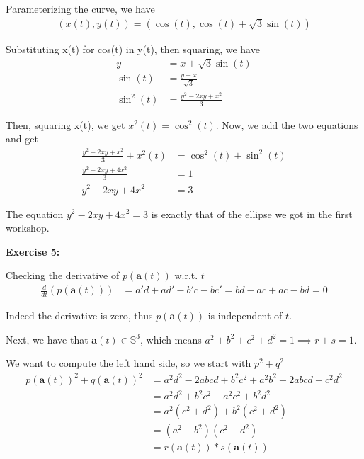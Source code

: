 \documentclass[12pt]{article}
\begin{document}
Parameterizing the curve, we have
\begin{align*}
    (x(t), y(t)) = (\cos(t), \cos(t) + \sqrt{3}\sin(t))
\end{align*}

Substituting x(t) for cos(t) in y(t), then squaring, we have
\begin{align*}
    y         & = x + \sqrt{3}\sin(t)      \\
    \sin(t)   & = \frac{y-x}{\sqrt{3}}     \\
    \sin^2(t) & =  \frac{y^2-2xy + x^2}{3}
\end{align*}

Then, squaring x(t), we get $x^2(t) = \cos^2(t)$. Now, we add the two equations and get
\begin{align*}
    \frac{y^2-2xy + x^2}{3} + x^2(t) & = \cos^2(t) + \sin^2(t) \\
    \frac{y^2-2xy + 4x^2}{3}         & = 1                     \\
    y^2-2xy + 4x^2                   & = 3
\end{align*}

The equation $y^2-2xy + 4x^2= 3$ is exactly that of the ellipse we got in the first workshop.

\noindent{}\textbf{Exercise 5:}

Checking the derivative of $p(\mathbf{a}(t))$ w.r.t. $t$
\begin{align*}
    \frac{d}{dt}(p(\mathbf{a}(t))) & = a'd + ad' - b'c - bc' = bd - ac + ac -bd = 0
\end{align*}

Indeed the derivative is zero, thus $p(\mathbf{a}(t))$ is independent of $t$.

\vspace{10pt}

Next, we have that ${\mathbf{a}(t)} \in{\mathbb{S}^3}$, which means $a^2+b^2+c^2+d^2 = 1 \implies{} r + s = 1$.

We want to compute the left hand side, so we start with $p^2 + q^2$
\begin{align*}
    p(\mathbf{a}(t))^2 + q(\mathbf{a}(t))^2 & = a^2d^2 - 2abcd + b^2c^2 + a^2b^2 + 2abcd + c^2d^2 \\
                                            & = a^2d^2 + b^2c^2 + a^2c^2 + b^2d^2                 \\
                                            & = a^2(c^2 + d^2) + b^2(c^2 + d^2)                   \\
                                            & = (a^2 + b^2)(c^2 + d^2)                            \\
                                            & = r(\mathbf{a}(t))*s(\mathbf{a}(t))
\end{align*}
\end{document}
